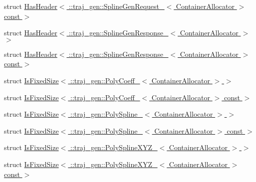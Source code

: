 \begin{DoxyCompactItemize}
struct \hyperlink{structros_1_1message__traits_1_1_has_header_3_01_1_1traj__gen_1_1_spline_gen_request___3_01_cont2d272e5e4f2aba4d565aef3b6188f511}{Has\+Header$<$ \+::traj\+\_\+gen\+::\+Spline\+Gen\+Request\+\_\+$<$ Container\+Allocator $>$ const  $>$}
\item 
struct \hyperlink{structros_1_1message__traits_1_1_has_header_3_01_1_1traj__gen_1_1_spline_gen_response___3_01_container_allocator_01_4_01_4}{Has\+Header$<$ \+::traj\+\_\+gen\+::\+Spline\+Gen\+Response\+\_\+$<$ Container\+Allocator $>$ $>$}
\item 
struct \hyperlink{structros_1_1message__traits_1_1_has_header_3_01_1_1traj__gen_1_1_spline_gen_response___3_01_con1d0f3f08c39175b3253cd03ec47957a2}{Has\+Header$<$ \+::traj\+\_\+gen\+::\+Spline\+Gen\+Response\+\_\+$<$ Container\+Allocator $>$ const  $>$}
\item 
struct \hyperlink{structros_1_1message__traits_1_1_is_fixed_size_3_01_1_1traj__gen_1_1_poly_coeff___3_01_container_allocator_01_4_01_4}{Is\+Fixed\+Size$<$ \+::traj\+\_\+gen\+::\+Poly\+Coeff\+\_\+$<$ Container\+Allocator $>$ $>$}
\item 
struct \hyperlink{structros_1_1message__traits_1_1_is_fixed_size_3_01_1_1traj__gen_1_1_poly_coeff___3_01_container_allocator_01_4_01const_01_01_4}{Is\+Fixed\+Size$<$ \+::traj\+\_\+gen\+::\+Poly\+Coeff\+\_\+$<$ Container\+Allocator $>$ const  $>$}
\item 
struct \hyperlink{structros_1_1message__traits_1_1_is_fixed_size_3_01_1_1traj__gen_1_1_poly_spline___3_01_container_allocator_01_4_01_4}{Is\+Fixed\+Size$<$ \+::traj\+\_\+gen\+::\+Poly\+Spline\+\_\+$<$ Container\+Allocator $>$ $>$}
\item 
struct \hyperlink{structros_1_1message__traits_1_1_is_fixed_size_3_01_1_1traj__gen_1_1_poly_spline___3_01_containe7fdff08ae232c9034e9184a70d2080ac}{Is\+Fixed\+Size$<$ \+::traj\+\_\+gen\+::\+Poly\+Spline\+\_\+$<$ Container\+Allocator $>$ const  $>$}
\item 
struct \hyperlink{structros_1_1message__traits_1_1_is_fixed_size_3_01_1_1traj__gen_1_1_poly_spline_x_y_z___3_01_container_allocator_01_4_01_4}{Is\+Fixed\+Size$<$ \+::traj\+\_\+gen\+::\+Poly\+Spline\+X\+Y\+Z\+\_\+$<$ Container\+Allocator $>$ $>$}
\item 
struct \hyperlink{structros_1_1message__traits_1_1_is_fixed_size_3_01_1_1traj__gen_1_1_poly_spline_x_y_z___3_01_co1eebd7152468657d2fd84456c467c5f0}{Is\+Fixed\+Size$<$ \+::traj\+\_\+gen\+::\+Poly\+Spline\+X\+Y\+Z\+\_\+$<$ Container\+Allocator $>$ const  $>$}
\item 

\end{DoxyCompactItemize}
